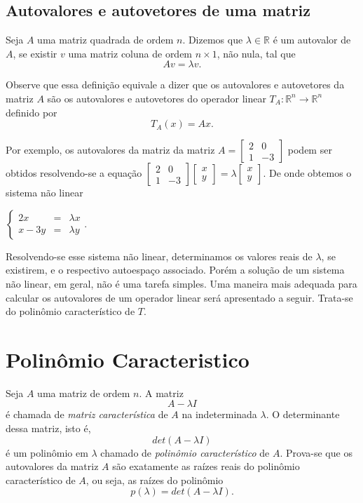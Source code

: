 \subsection{Autovalores e autovetores de uma matriz}

Seja $A$ uma matriz quadrada de ordem $n$. Dizemos que $\lambda \in \mathbb{R}$ é um  autovalor  de $A$, se existir  $v$ uma matriz coluna  de ordem $n\times  1$, não nula,  tal que $$Av=\lambda v.$$

Observe que essa definição  equivale a dizer que os autovalores e autovetores da matriz $A$ são os autovalores e autovetores do operador linear $T_A: \mathbb{R}^n \rightarrow \mathbb{R}^n$ definido por $$T_A(x)=Ax.$$

Por exemplo, os autovalores da matriz da matriz
$A= \begin{bmatrix}
2 & 0\\
 1& -3
\end{bmatrix}$ podem ser obtidos resolvendo-se a equação $ \begin{bmatrix}
2 & 0\\
 1& -3
\end{bmatrix}\begin{bmatrix}
x\\
 y
\end{bmatrix}=\lambda\begin{bmatrix}
x\\
 y
\end{bmatrix}.$
De onde obtemos o sistema não linear

$\left\{\begin{matrix}
2x & = & \lambda x \\
 x-3y& = & \lambda y
\end{matrix}\right.$.

 Resolvendo-se esse sistema não linear, determinamos os valores reais de $\lambda$, se existirem, e o respectivo autoespaço associado. Porém a solução de um sistema não linear, em geral, não é uma tarefa simples. Uma maneira mais adequada para calcular os autovalores de um operador linear será apresentado a seguir. Trata-se do polinômio característico de $T$.



\section{Polinômio Caracteristico}

Seja  $A$ uma  matriz de ordem $n$. A matriz $$A-\lambda I$$ é chamada de \textit{matriz característica} de $A$ na indeterminada $\lambda$. O determinante  dessa matriz, isto é, $$det(A-\lambda I)$$ é um polinômio  em $\lambda$ chamado de \textit{polinômio característico} de $A$. Prova-se que os autovalores da matriz $A$ são exatamente as raízes reais do polinômio característico de $A$, ou seja, as raízes do polinômio $$p(\lambda)=det(A-\lambda I).$$


